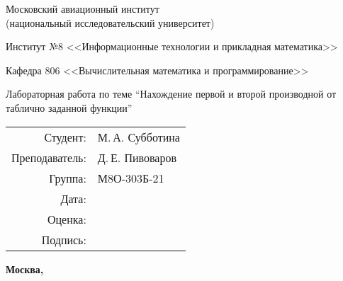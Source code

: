 \begin{titlepage}
\begin{center}
\bfseries

{\Large Московский авиационный институт\\ (национальный исследовательский университет)

}

\vspace{48pt}

{\large Институт №8 <<Информационные технологии и прикладная математика>>
}

\vspace{36pt}

{\large Кафедра 806 <<Вычислительная математика и программирование>>

}


\vspace{48pt}

Лабораторная работа по теме \enquote{Нахождение первой и второй производной от таблично заданной функции}

\end{center}

\vspace{72pt}

\begin{flushright}
\begin{tabular}{rl}
Студент: & М.\,А. Субботина \\
Преподаватель: & Д.\,Е. Пивоваров \\
Группа: & М8О-303Б-21 \\
Дата: & \\
Оценка: & \\
Подпись: & \\
\end{tabular}
\end{flushright}

\vfill

\begin{center}
\bfseries
Москва, \the\year
\end{center}
\end{titlepage}

\pagebreak
